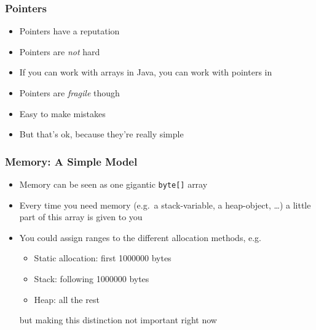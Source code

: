 \begin{frame}
  \frametitle{Pointers}
  \begin{itemize}
    \item Pointers have a reputation
    \item Pointers are \emph{not} hard
    \item If you can work with arrays in Java, you can work with pointers in \cpp
    \item Pointers are \emph{fragile} though
    \item Easy to make mistakes
    \item But that's ok, because they're really simple
  \end{itemize}
\end{frame}

\begin{frame}
  \frametitle{Memory: A Simple Model}
  \begin{itemize}
    \item Memory can be seen as one gigantic {\tt byte[]} array
    \item Every time you need memory (e.g.\ a stack-variable, a heap-object, \dots)
          a little part of this array is given to you
    \item You could assign ranges to the different allocation methods, e.g.
          \begin{itemize}
            \item Static allocation: first 1000000 bytes
            \item Stack: following 1000000 bytes
            \item Heap: all the rest
          \end{itemize}
          but making this distinction not important right now
  \end{itemize}
\end{frame}

